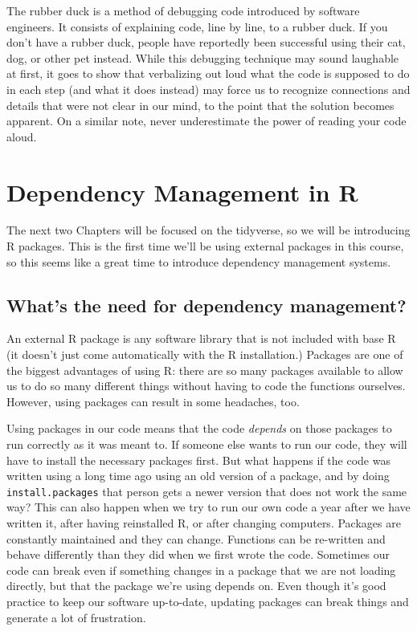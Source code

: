 \documentclass[
]{book}
\begin{document}
The rubber duck is a method of debugging code introduced by software engineers.
It consists of explaining code, line by line, to a rubber duck. If you don't
have a rubber duck, people have reportedly been successful using their cat, dog,
or other pet instead. While this debugging technique may sound laughable at
first, it goes to show that verbalizing out loud what the code is supposed to
do in each step (and what it does instead) may force us to recognize connections
and details that were not clear in our mind, to the point that the solution
becomes apparent. On a similar note, never underestimate the power of reading
your code aloud.

\hypertarget{renv}{%
\chapter{Dependency Management in R}\label{renv}}

The next two Chapters will be focused on the tidyverse, so we will be
introducing R packages. This is the first time we'll be using external packages
in this course, so this seems like a great time to introduce dependency
management systems.

\hypertarget{whats-the-need-for-dependency-management}{%
\section{What's the need for dependency management?}\label{whats-the-need-for-dependency-management}}

An external R package is any software library that is not included with base R
(it doesn't just come automatically with the R installation.) Packages are one
of the biggest advantages of using R: there are so many packages available to
allow us to do so many different things without having to code the functions
ourselves. However, using packages can result in some headaches, too.

Using packages in our code means that the code \emph{depends} on those packages to
run correctly as it was meant to. If someone else wants to run our code, they
will have to install the necessary packages first. But what happens if the code
was written using a long time ago using an old version of a package, and by
doing \texttt{install.packages} that person gets a newer version that does not work the
same way? This can also happen when we try to run our own code a year after we
have written it, after having reinstalled R, or after changing computers.
Packages are constantly maintained and they can change. Functions can be
re-written and behave differently than they did when we first wrote the code.
Sometimes our code can break even if something changes in a package that we
are not loading directly, but that the package we're using depends on.
Even though it's good practice to keep our software up-to-date, updating
packages can break things and generate a lot of frustration.
\end{document}
